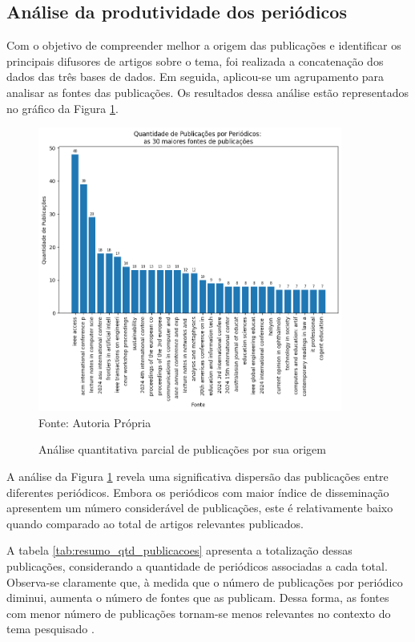 \documentclass[openany,oneside,a4paper,9pt]{extarticle}
\begin{document}
\subsection{Análise da produtividade dos periódicos}

Com o objetivo de compreender melhor a origem das publicações e identificar os principais difusores de artigos sobre o tema, foi realizada a concatenação dos dados das três bases de dados. Em seguida, aplicou-se um agrupamento para analisar as fontes das publicações. Os resultados dessa análise estão representados no gráfico da Figura \ref{fig:3}.

\begin{figure}[H]
    \centering
    \caption{Análise quantitativa parcial de publicações por sua origem}
    \includegraphics[width=10cm]{qtd_publicacoes_fonte.png}
    {\\\footnotesize Fonte: Autoria Própria}
    \label{fig:3}
\end{figure}

A análise da Figura \ref{fig:3} revela uma significativa dispersão das publicações entre diferentes periódicos. Embora os periódicos com maior índice de disseminação apresentem um número considerável de publicações, este é relativamente baixo quando comparado ao total de artigos relevantes publicados.

A tabela \ref{tab:resumo_qtd_publicacoes} apresenta a totalização dessas publicações, considerando a quantidade de periódicos associadas a cada total. Observa-se claramente que, à medida que o número de publicações por periódico diminui, aumenta o número de fontes que as publicam. Dessa forma, as fontes com menor número de publicações tornam-se menos relevantes no contexto do tema pesquisado \cite{lousada2012produccao}.
\end{document}
